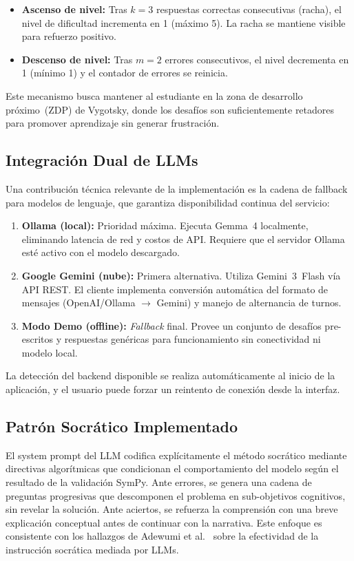 \documentclass{ieeetj}
\begin{document}
\begin{itemize}
  \item \textbf{Ascenso de nivel:} Tras $k=3$ respuestas correctas consecutivas (racha), el nivel de dificultad incrementa en 1 (m\'aximo 5). La racha se mantiene visible para refuerzo positivo.
  \item \textbf{Descenso de nivel:} Tras $m=2$ errores consecutivos, el nivel decrementa en 1 (m\'inimo 1) y el contador de errores se reinicia.
\end{itemize}

Este mecanismo busca mantener al estudiante en la zona de desarrollo pr\'oximo~(ZDP) de Vygotsky, donde los desaf\'ios son suficientemente retadores para promover aprendizaje sin generar frustraci\'on.

\subsection{Integraci\'on Dual de LLMs}

Una contribuci\'on t\'ecnica relevante de la implementaci\'on es la cadena de fallback para modelos de lenguaje, que garantiza disponibilidad continua del servicio:

\begin{enumerate}
  \item \textbf{Ollama (local):} Prioridad m\'axima. Ejecuta Gemma~4 localmente, eliminando latencia de red y costos de API. Requiere que el servidor Ollama est\'e activo con el modelo descargado.
  \item \textbf{Google Gemini (nube):} Primera alternativa. Utiliza Gemini~3~Flash v\'ia API REST. El cliente implementa conversi\'on autom\'atica del formato de mensajes (OpenAI/Ollama $\rightarrow$ Gemini) y manejo de alternancia de turnos.
  \item \textbf{Modo Demo (offline):} \textit{Fallback} final. Provee un conjunto de desaf\'ios pre-escritos y respuestas gen\'ericas para funcionamiento sin conectividad ni modelo local.
\end{enumerate}

La detecci\'on del backend disponible se realiza autom\'aticamente al inicio de la aplicaci\'on, y el usuario puede forzar un reintento de conexi\'on desde la interfaz.

\subsection{Patr\'on Socr\'atico Implementado}

El system prompt del LLM codifica expl\'icitamente el m\'etodo socr\'atico mediante directivas algor\'itmicas que condicionan el comportamiento del modelo seg\'un el resultado de la validaci\'on SymPy. Ante errores, se genera una cadena de preguntas progresivas que descomponen el problema en sub-objetivos cognitivos, sin revelar la soluci\'on. Ante aciertos, se refuerza la comprensi\'on con una breve explicaci\'on conceptual antes de continuar con la narrativa. Este enfoque es consistente con los hallazgos de Adewumi et al.~\cite{adewumi2025findings} sobre la efectividad de la instrucci\'on socr\'atica mediada por LLMs.





\vfill\pagebreak
\end{document}
